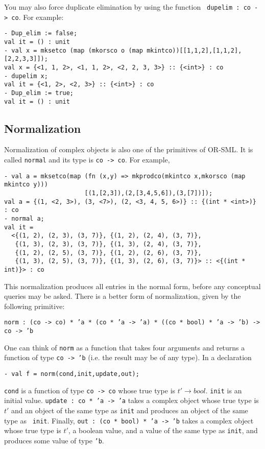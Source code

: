 You may also force duplicate elimination by using the function {\tt
dupelim : co -> co}. For example:

{\small
\begin{verbatim}
- Dup_elim := false;
val it = () : unit
- val x = mksetco (map (mkorsco o (map mkintco))[[1,1,2],[1,1,2],[2,2,3,3]]);
val x = {<1, 1, 2>, <1, 1, 2>, <2, 2, 3, 3>} :: {<int>} : co
- dupelim x;
val it = {<1, 2>, <2, 3>} :: {<int>} : co
- Dup_elim := true;
val it = () : unit
\end{verbatim}
}


\subsection{Normalization}


Normalization of complex objects is also one of the primitives of OR-SML.
It is called {\tt normal} and its type is {\tt co -> co}. For example,

{\small \begin{verbatim}
- val a = mksetco(map (fn (x,y) => mkprodco(mkintco x,mkorsco (map mkintco y)))
                      [(1,[2,3]),(2,[3,4,5,6]),(3,[7])]);
val a = {(1, <2, 3>), (3, <7>), (2, <3, 4, 5, 6>)} :: {(int * <int>)} : co
- normal a;
val it =
  <{(1, 2), (2, 3), (3, 7)}, {(1, 2), (2, 4), (3, 7)},
   {(1, 3), (2, 3), (3, 7)}, {(1, 3), (2, 4), (3, 7)},
   {(1, 2), (2, 5), (3, 7)}, {(1, 2), (2, 6), (3, 7)},
   {(1, 3), (2, 5), (3, 7)}, {(1, 3), (2, 6), (3, 7)}> :: <{(int * int)}> : co
\end{verbatim} }

This normalization produces all entries in the normal form, before any
conceptual queries may be asked. There is a better form of
normalization, given by the following primitive:

{\tt norm : (co -> co) * 'a * (co * 'a -> 'a) * ((co * bool) * 'a -> 'b) -> co -> 'b}

One can think of {\tt norm} as a function that takes four arguments
and returns a function of type {\tt co -> 'b} (i.e. the result may be
of any type). In a declaration 

{\small
\begin{verbatim}
- val f = norm(cond,init,update,out);
\end{verbatim}
}

{\tt cond} is a function of type {\tt co -> co} whose true type is $t'
\to bool$. {\tt init} is an initial value. {\tt update : co * 'a -> 'a} takes
a complex object whose true type is $t'$ and an object of the same
type as {\tt init} and produces an object of the same type as {\tt
init}. Finally, {\tt out : (co * bool) * 'a -> 'b} takes a complex
object whose true type is $t'$, a boolean value, and a value of the
same type as {\tt init}, and produces some value of type {\tt 'b}.

